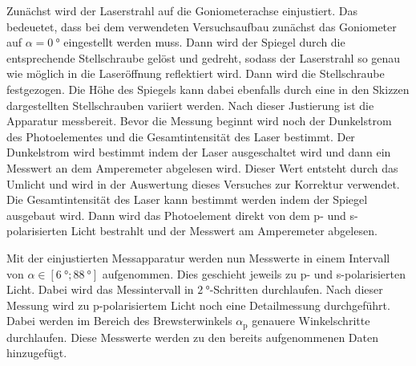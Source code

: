 Zunächst wird der Laserstrahl auf die Goniometerachse einjustiert. Das bedeuetet, dass bei dem verwendeten Versuchsaufbau zunächst das Goniometer auf $\alpha = \qty{0}{\degree}$
eingestellt werden muss. Dann wird der Spiegel durch die entsprechende Stellschraube gelöst und gedreht, sodass der Laserstrahl so genau wie möglich in die Laseröffnung 
reflektiert wird. Dann wird die Stellschraube festgezogen. Die Höhe des Spiegels kann dabei ebenfalls durch eine in den Skizzen dargestellten Stellschrauben variiert werden.
Nach dieser Justierung ist die Apparatur messbereit. 
Bevor die Messung beginnt wird noch der Dunkelstrom des Photoelementes und  die Gesamtintensität des Laser bestimmt. Der Dunkelstrom wird bestimmt indem der Laser ausgeschaltet 
wird und dann ein Messwert an dem Amperemeter abgelesen wird. Dieser Wert entsteht durch das Umlicht und wird in der Auswertung dieses Versuches zur Korrektur verwendet. 
Die Gesamtintensität des Laser kann bestimmt werden indem der Spiegel ausgebaut wird. Dann wird das Photoelement direkt von dem p- und s-polarisierten Licht bestrahlt und 
der Messwert am Amperemeter abgelesen.

Mit der einjustierten Messapparatur werden nun Messwerte in einem Intervall von $\alpha \in \left[\qty{6}{\degree} ; \qty{88}{\degree}\right]$ aufgenommen. Dies geschieht 
jeweils zu p- und s-polarisierten Licht. Dabei wird das Messintervall in $\qty{2}{\degree}$-Schritten durchlaufen. Nach dieser Messung wird zu p-polarisiertem Licht noch eine
Detailmessung durchgeführt. Dabei werden im Bereich des Brewsterwinkels $\alpha_{\text{p}}$ genauere Winkelschritte durchlaufen. Diese Messwerte werden zu den bereits 
aufgenommenen Daten hinzugefügt.